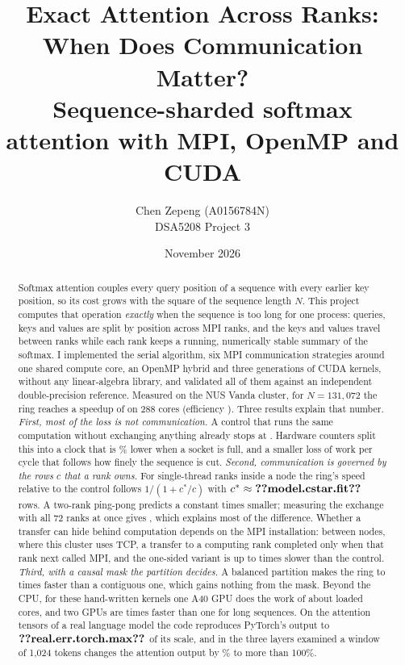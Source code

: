 \documentclass[10pt,a4paper]{article}
\title{\textcolor{ink}{\bfseries Exact Attention Across Ranks:\\ When Does Communication Matter?}\\[4pt]
\large Sequence-sharded softmax attention with MPI, OpenMP and CUDA}
\author{Chen Zepeng (A0156784N)\\ DSA5208 Project 3}
\date{November 2026}
\begin{document}
\maketitle

\begin{abstract}
\noindent Softmax attention couples every query position of a sequence with every
earlier key position, so its cost grows with the square of the sequence length $N$.
This project computes that operation \emph{exactly} when the sequence is too long
for one process: queries, keys and values are split by position across MPI ranks,
and the keys and values travel between ranks while each rank keeps a running,
numerically stable summary of the softmax. I implemented the serial algorithm, six
MPI communication strategies around one shared compute core, an OpenMP hybrid and
three generations of CUDA kernels, without any linear-algebra library, and
validated all of them against an independent double-precision reference.
Measured on the NUS Vanda cluster, for $N=131{,}072$ the ring reaches a speedup of
 on 288 cores (efficiency ). Three results
explain that number.
\emph{First, most of the loss is not communication.} A control that runs the same
computation without exchanging anything already stops at .
Hardware counters split this into a clock that is \% lower
when a socket is full, and a smaller loss of work per cycle that follows how
finely the sequence is cut.
\emph{Second, communication is governed by the rows $c$ that a rank owns.} For
single-thread ranks inside a node the ring's speed relative to the control follows
$1/(1+c^*/c)$ with $c^*\approx\n{model.cstar.fit}$ rows. A two-rank ping-pong predicts
a constant  times smaller; measuring the exchange with all 72
ranks at once gives , which explains most of the difference. Whether a transfer can hide behind computation
depends on the MPI installation: between nodes, where this cluster uses TCP, a
transfer to a computing rank completed only when that rank next called MPI, and
the one-sided variant is up to  times slower than
the control.
\emph{Third, with a causal mask the partition decides.} A balanced partition makes
the ring  to 
times faster than a contiguous one, which gains nothing from the mask.
Beyond the CPU, for these hand-written kernels one A40 GPU does the work of about
 loaded cores, and two GPUs are
 times faster than one for long sequences. On the
attention tensors of a real language model the code reproduces PyTorch's output to
$\n{real.err.torch.max}$ of its scale, and in the three layers examined a window of
1{,}024 tokens changes the attention output by \% to more
than 100\%.
\end{abstract}
\end{document}
